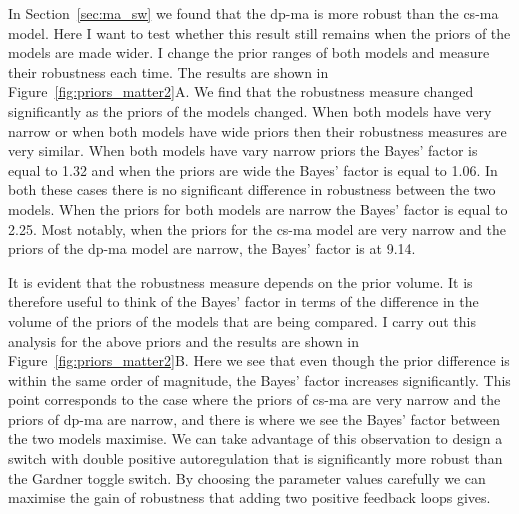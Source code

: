 In Section~\ref{sec:ma_sw} we found that the \acrshort{dp-ma} is more robust than the \acrshort{cs-ma} model. Here I want to test whether this result still remains when the priors of the models are made wider. I change the prior ranges of both models and measure their robustness each time. The results are shown in Figure~\ref{fig:priors_matter2}A. We find that the robustness measure changed significantly as the priors of the models changed. When both models have very narrow or when both models have wide priors then their robustness measures are very similar. When both models have vary narrow priors the Bayes' factor is equal to 1.32 and when the priors are wide the Bayes' factor is equal to 1.06. In both these cases there is no significant difference in robustness between the two models. When the priors for both models are narrow the Bayes' factor is equal to 2.25. Most notably, when the priors for the \acrshort{cs-ma} model are very narrow and the priors of the \acrshort{dp-ma} model are narrow, the Bayes' factor is at 9.14. 

It is evident that the robustness measure depends on the prior volume. It is therefore useful to think of the Bayes' factor in terms of the difference in the volume of the priors of the models that are being compared. I carry out this analysis for the above priors and the results are shown in Figure~\ref{fig:priors_matter2}B. Here we see that even though the prior difference is within the same order of magnitude, the Bayes' factor increases significantly. This point corresponds to the case where the priors of \acrshort{cs-ma} are very narrow and the priors of \acrshort{dp-ma} are narrow, and there is where we see the Bayes' factor between the two models maximise. We can take advantage of this observation to design a switch with double positive autoregulation that is significantly more robust than the Gardner toggle switch. By choosing the parameter values carefully we can maximise the gain of robustness that adding two positive feedback loops gives. 

